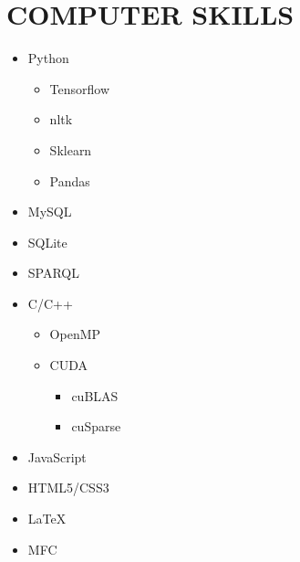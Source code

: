 \section{COMPUTER SKILLS}

\begin{cvcolumns}
	{
		\vspace{-2em}
		\begin{multicols}{2}
			\begin{itemize}
				\item Python
					\begin{itemize}
						\item Tensorflow
						\item nltk
						\item Sklearn
						\item Pandas
				\end{itemize}
				\item MySQL
				\item SQLite
				\item SPARQL
				\item C/C++ 
					\begin{itemize}
						\item OpenMP
						\item CUDA
						\begin{itemize}
							\item cuBLAS
							\item cuSparse
						\end{itemize}
					\end{itemize}
				\item JavaScript 
				\item HTML5/CSS3
				\item \LaTeX 
				\item MFC   
			\end{itemize}
		\end{multicols}
	}
	
	
\end{cvcolumns}

